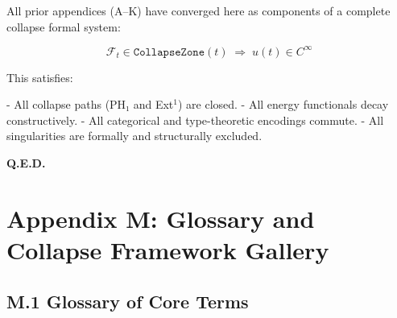 \documentclass[11pt]{article}
\begin{document}
All prior appendices (A–K) have converged here as components of a complete collapse formal system:

\[
\boxed{
\mathcal{F}_t \in \texttt{CollapseZone}(t)
\;\Longrightarrow\;
u(t) \in C^\infty
}
\]

This satisfies:

- All collapse paths (PH₁ and Ext$^1$) are closed.
- All energy functionals decay constructively.
- All categorical and type-theoretic encodings commute.
- All singularities are formally and structurally excluded.

\begin{flushright}
\textbf{Q.E.D.}
\end{flushright}




\section*{Appendix M: Glossary and Collapse Framework Gallery}

\subsection*{M.1 Glossary of Core Terms}
\end{document}
